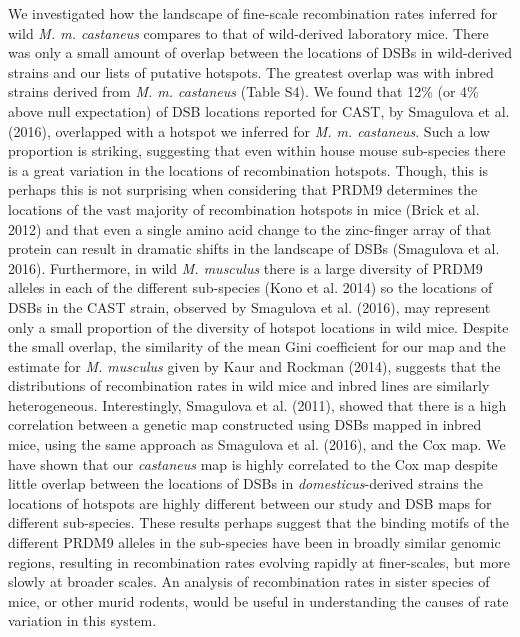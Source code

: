 We investigated how the landscape of fine-scale recombination rates inferred for wild \emph{M. m. castaneus} compares to that of wild-derived laboratory mice. There was only a small amount of overlap between the locations of DSBs in wild-derived strains and our lists of putative hotspots. The greatest overlap was with inbred strains derived from \emph{M. m. castaneus} (Table S4). We found that 12\% (or 4\% above null expectation) of DSB locations reported for CAST, by Smagulova et al. (2016), overlapped with a hotspot we inferred for \emph{M. m. castaneus}. Such a low proportion is striking, suggesting that even within house mouse sub-species there is a great variation in the locations of recombination hotspots. Though, this is perhaps this is not surprising when considering that PRDM9 determines the locations of the vast majority of recombination hotspots in mice (Brick et al. 2012) and that even a single amino acid change to the zinc-finger array of that protein can result in dramatic shifts in the landscape of DSBs (Smagulova et al. 2016). Furthermore, in wild \textit{M. musculus} there is a large diversity of PRDM9 alleles in each of the different sub-species (Kono et al. 2014) so the locations of DSBs in the CAST strain, observed by Smagulova et al. (2016), may represent only a small proportion of the diversity of hotspot locations in wild mice. Despite the small overlap, the similarity of the mean Gini coefficient for our map and the estimate for \textit{M. musculus }given by Kaur and Rockman (2014), suggests that the distributions of recombination rates in wild mice and inbred lines are similarly heterogeneous. Interestingly, Smagulova et al. (2011), showed that there is a high correlation between a genetic map constructed using DSBs mapped in inbred mice, using the same approach as Smagulova et al. (2016), and the Cox map. We have shown that our \textit{castaneus} map is highly correlated to the Cox map despite little overlap between the locations of DSBs in \textit{domesticus}-derived strains the locations of hotspots are highly different between our study and DSB maps for different sub-species. These results perhaps suggest that the binding motifs of the different PRDM9 alleles in the sub-species have been in broadly similar genomic regions, resulting in recombination rates evolving rapidly at finer-scales, but more slowly at broader scales. An analysis of recombination rates in sister species of mice, or other murid rodents, would be useful in understanding the causes of rate variation in this system.

